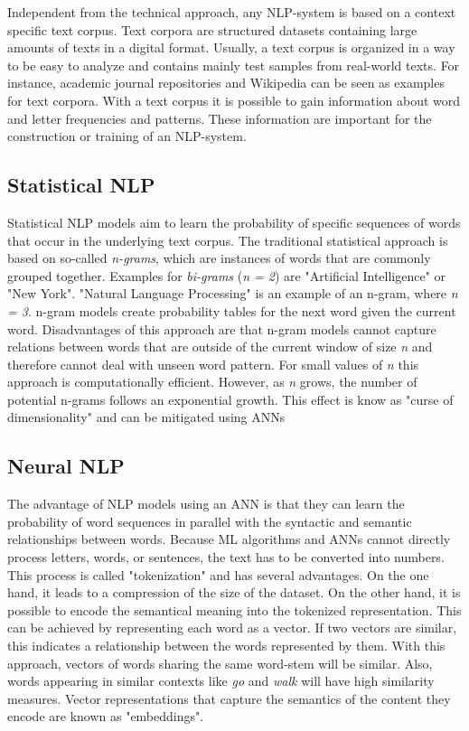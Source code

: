 Independent from the technical approach, any \ac{NLP}-system is based on a context specific text corpus. Text corpora are structured datasets containing large amounts of texts in a digital format. Usually, a text corpus is organized in a way to be easy to analyze and contains mainly test samples from real-world texts. For instance, academic journal repositories and Wikipedia can be seen as examples for text corpora. With a text corpus it is possible to gain information about word and letter frequencies and patterns. These information are important for the construction or training of an \ac{NLP}-system.
\cite{church1995commercial,vzivzka2019text}

\subsection{Statistical NLP}
Statistical \ac{NLP} models aim to learn the probability of specific sequences of words that occur in the underlying text corpus.
The traditional statistical approach is based on so-called \textit{n-grams}, which are instances of words that are commonly grouped together. Examples for \textit{bi-grams} (\textit{n = 2}) are "Artificial Intelligence" or "New York". "Natural Language Processing" is an example of an n-gram, where \textit{n = 3}. n-gram models create probability tables for the next word given the current word. Disadvantages of this approach are that n-gram models cannot capture relations between words that are outside of the current window of size \textit{n} and therefore cannot deal with unseen word pattern. For small values of \textit{n} this approach is computationally efficient. However, as \textit{n} grows, the number of potential n-grams follows an exponential growth. This effect is know as "curse of dimensionality" and can be mitigated using \acp{ANN}
\cite{bengio,vzivzka2019text}

\subsection{Neural NLP}
The advantage of \ac{NLP} models using an \ac{ANN} is that they can learn the probability of word sequences in parallel with the syntactic and semantic relationships between words. 
Because \ac{ML} algorithms and \acp{ANN} cannot directly process letters, words, or sentences, the text has to be converted into numbers. This process is called "tokenization" and has several advantages. On the one hand, it leads to a compression of the size of the dataset. On the other hand, it is possible to encode the semantical meaning into the tokenized representation. This can be achieved by representing each word as a vector. If two vectors are similar, this indicates a relationship between the words represented by them. With this approach, vectors of words sharing the same word-stem will be similar. Also, words appearing in similar contexts like \textit{go} and \textit{walk} will have high similarity measures. Vector representations that capture the semantics of the content they encode are known as "embeddings".
\cite{bengio,vzivzka2019text}

